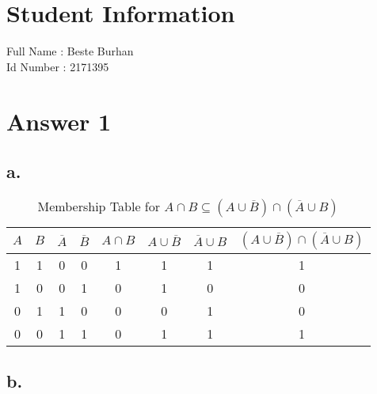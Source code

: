 \documentclass[12pt]{article}
\begin{document}
\section*{Student Information } 
Full Name : Beste Burhan \\
Id Number : 2171395 \\

\section*{Answer 1}


\subsection*{a.}

\begin{table}[H]

\small
\centering
\caption{ Membership Table for  $ A \cap B \subseteq (A \cup \overline{B} )\cap (\overline{A} \cup B)$ }
\label{table:question 1/a}
\begin{tabular}{|c c|c c|c|c|c|c|}	%
\hline 	
			
\textbf{$A$} & \textbf{$B$} & \textbf{$\overline{A}$} & \textbf{$\overline{B}$} & \textbf{$A \cap B$} & \textbf{$A \cup \overline{B}$} & \textbf{$\overline{A }\cup B$} & \textbf{$(A \cup \overline{B})\cap(\overline{A }\cup B)  $}\\
\hline 
\hline 
1 & 1 & 0 & 0 & 1 & 1 & 1 & 1\\			%
1 & 0 & 0 & 1 & 0 & 1 & 0 & 0\\
0 & 1 & 1 & 0 & 0 & 0 & 1 & 0\\
0 & 0 & 1 & 1 & 0 & 1 & 1 & 1\\
\hline 

\end{tabular}

\end{table}

\subsection*{b.}
\end{document}
